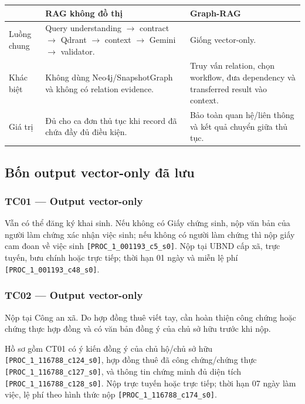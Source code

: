 \documentclass[11pt,a4paper]{article}
\newcommand{\src}[1]{\texttt{#1}}
\begin{document}
\begin{tabularx}{\linewidth}{p{3cm}YY}
\toprule
& \textbf{RAG không đồ thị} & \textbf{Graph-RAG}\\
\midrule
Luồng chung & Query understanding $\rightarrow$ contract $\rightarrow$ Qdrant $\rightarrow$ context $\rightarrow$ Gemini $\rightarrow$ validator. & Giống vector-only.\\
Khác biệt & Không dùng Neo4j/SnapshotGraph và không có relation evidence. & Truy vấn relation, chọn workflow, đưa dependency và transferred result vào context.\\
Giá trị & Đủ cho ca đơn thủ tục khi record đã chứa đầy đủ điều kiện. & Bảo toàn quan hệ/liên thông và kết quả chuyển giữa thủ tục.\\
\bottomrule
\end{tabularx}

\subsection{Bốn output vector-only đã lưu}

\subsubsection*{TC01 --- Output vector-only}
\begin{answerbox}
Vẫn có thể đăng ký khai sinh. Nếu không có Giấy chứng sinh, nộp văn bản của người làm chứng xác nhận việc sinh; nếu không có người làm chứng thì nộp giấy cam đoan về việc sinh \src{[PROC\_1\_001193\_c5\_s0]}. Nộp tại UBND cấp xã, trực tuyến, bưu chính hoặc trực tiếp; thời hạn 01 ngày và miễn lệ phí \src{[PROC\_1\_001193\_c48\_s0]}.
\end{answerbox}

\subsubsection*{TC02 --- Output vector-only}
\begin{answerbox}
Nộp tại Công an xã. Do hợp đồng thuê viết tay, cần hoàn thiện công chứng hoặc chứng thực hợp đồng và có văn bản đồng ý của chủ sở hữu trước khi nộp.

Hồ sơ gồm CT01 có ý kiến đồng ý của chủ hộ/chủ sở hữu \src{[PROC\_1\_116788\_c124\_s0]}, hợp đồng thuê đã công chứng/chứng thực \src{[PROC\_1\_116788\_c127\_s0]}, và thông tin chứng minh đủ diện tích \src{[PROC\_1\_116788\_c128\_s0]}. Nộp trực tuyến hoặc trực tiếp; thời hạn 07 ngày làm việc, lệ phí theo hình thức nộp \src{[PROC\_1\_116788\_c174\_s0]}.
\end{answerbox}
\end{document}
